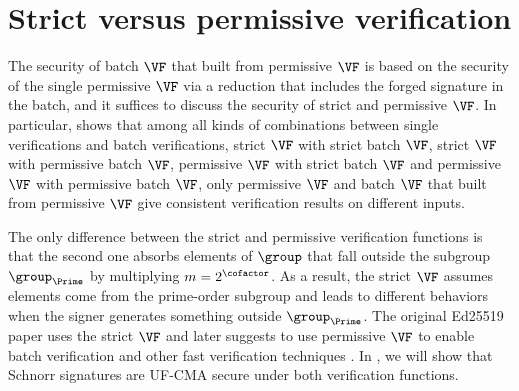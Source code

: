 \section{Strict versus permissive verification} \label{sec-vf}


 The security of batch $\VF$ that built from permissive $\VF$ is based on the security of the single permissive $\VF$ via a reduction that includes the forged signature in the batch, and it suffices to discuss the security of strict and permissive $\VF$. In particular, \cite{10.1007/978-3-030-64357-7_4} shows that among all kinds of combinations between single verifications and batch verifications, strict $\VF$ with strict batch $\VF$, strict $\VF$ with permissive batch $\VF$, permissive $\VF$ with strict batch $\VF$ and permissive $\VF$ with permissive batch $\VF$,
only permissive $\VF$ and batch $\VF$ that built from permissive $\VF$ give consistent verification results on different inputs.

The only difference between the strict and permissive verification functions is that the second one absorbs elements of $\group$ that fall outside the subgroup $\group_{\Prime}$ by multiplying $m = 2^\cofactor$. As a result, the strict $\VF$ assumes elements come from the prime-order subgroup and leads to different behaviors when the signer generates something outside $\group_{\Prime}$. The original Ed25519 paper \cite{bernstein2012high} uses the strict $\VF$ and later \cite{10.1007/978-3-030-64357-7_4} suggests to use permissive $\VF$ to enable batch verification and other fast verification techniques \cite{EPRINT:Pornin20b}. In , we will show that Schnorr signatures are UF-CMA secure under both verification functions. 


